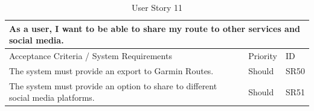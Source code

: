 \begin{table}[!htb]
  \caption{User Story 11}
  \label{tab:user-story-11}
  \begin{tabular}{ p{11cm} p{1cm}  p{1cm} }
  \hline
  \multicolumn{3}{p{13cm}}{As a user, I want to be able to share my route to other services and social media.}\\ 
  \hline
  Acceptance Criteria / System Requirements & Priority & ID\\
  \hline
  The system must provide an export to Garmin Routes. & Should & SR50\\
  The system must provide an option to share to different social media platforms. & Should & SR51\\
  \hline
  \end{tabular}
\end{table}